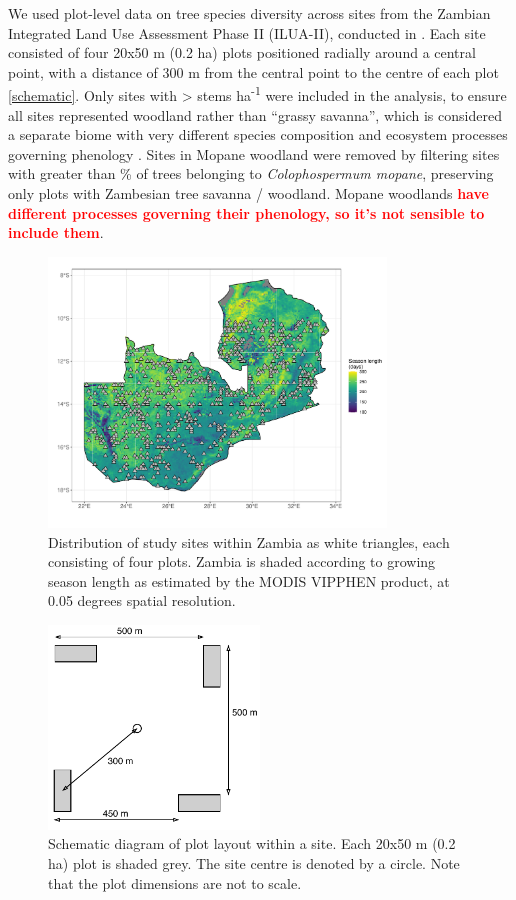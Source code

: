 \documentclass[11pt,a4paper]{article}
\newcommand{\todo}[1]{\textcolor{red}{\textbf{#1}}}   %
\begin{document}
We used plot-level data on tree species diversity across \nSites{} sites from the Zambian Integrated Land Use Assessment Phase II (ILUA-II), conducted in \censusDate{} \citep{}. Each site consisted of four 20x50 m (0.2 ha) plots positioned radially around a central point, with a distance of 300 m from the central point to the centre of each plot \autoref{schematic}. Only sites with >\stemsHa{} stems ha\textsuperscript{-1} were included in the analysis, to ensure all sites represented woodland rather than “grassy savanna”, which is considered a separate biome with very different species composition and ecosystem processes governing phenology \citep{Parr2014}. Sites in Mopane woodland were removed by filtering sites with greater than \mopanePer{}\% of trees belonging to \textit{Colophospermum mopane}, preserving only plots with Zambesian tree savanna / woodland. Mopane woodlands \todo{have different processes governing their phenology, so it's not sensible to include them}. 
\begin{figure}[H]
\centering
	\includegraphics[width=0.8\textwidth]{plot_loc}
	\caption{Distribution of study sites within Zambia as white triangles, each consisting of four plots. Zambia is shaded according to growing season length as estimated by the MODIS VIPPHEN product, at 0.05 degrees spatial resolution.}
	\label{plot_loc}
\end{figure}

\begin{figure}[H]
\centering
	\includegraphics[width=0.5\textwidth]{schematic.drawio}
	\caption{Schematic diagram of plot layout within a site. Each 20x50 m (0.2 ha) plot is shaded grey. The site centre is denoted by a circle. Note that the plot dimensions are not to scale.}
	\label{schematic}
\end{figure}
\end{document}
